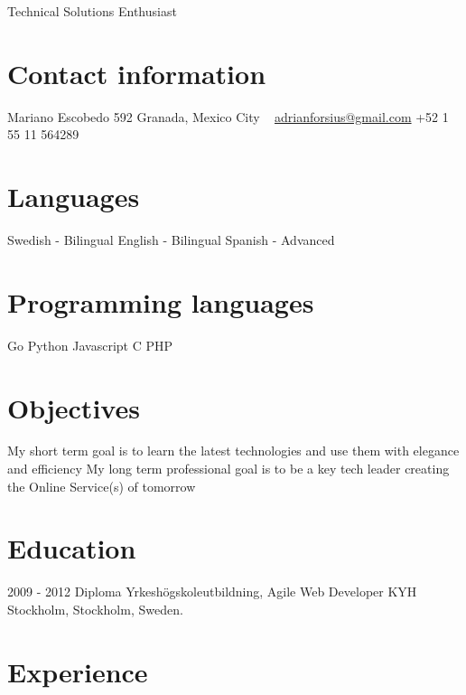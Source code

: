 \documentclass[]{friggeri-cv}
\begin{document}
       {Technical Solutions Enthusiast}

\begin{aside}
  \section{Contact information}
    Mariano Escobedo 592
    Granada, Mexico City
    ~
    \href{mailto:adrianforsius@gmail.com}{adrianforsius@gmail.com}
    +52 1 55 11 564289
  \section{Languages}
    Swedish - Bilingual
    English - Bilingual
    Spanish - Advanced
  \section{Programming languages}
    Go
    Python
    Javascript
    C
    PHP
\end{aside}

\section{Objectives}
    My short term goal is to learn the latest technologies and use them with elegance and efficiency
    My long term professional goal is to be a key tech leader creating the Online Service(s) of tomorrow

\section{Education}

\begin{entrylist}
  \entry
    {2009 - 2012}
    {Diploma Yrkeshögskoleutbildning, Agile Web Developer}
    {}
    {KYH Stockholm, Stockholm, Sweden.}
\end{entrylist}

\section{Experience}
\end{document}
